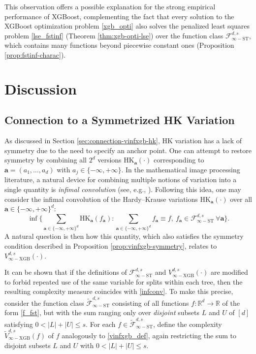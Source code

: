\documentclass[10pt]{article}
\newcommand{\R}{{\mathbb R}}
\newcommand{\fstinf}{{\mathcal{F}^{d, s}_{\infty-\text{ST}}}}
\newcommand{\oldfstinf}{{\widetilde{\mathcal{F}}^{d, s}_{\infty-\text{ST}}}}
\newcommand{\vinfxgb}{{V^{d, s}_{\infty-\text{XGB}}}}
\newcommand{\oldvinfxgb}{{\widetilde{V}^{d, s}_{\infty-\text{XGB}}}}
\newcommand{\hk}{{\text{HK}}}
\newcommand{\abf}{{\mathbf{a}}}
\begin{document}
This observation offers a possible explanation for the strong 
empirical performance of XGBoost, complementing the fact 
that every solution to the XGBoost optimization problem 
\eqref{xgb_opti} also solves the penalized least squares problem 
\eqref{lse_fstinf} (Theorem \ref{thm:xgb-opti-lse}) over the 
function class $\fstinf$, which contains many functions beyond 
piecewise constant ones (Proposition \ref{prop:fstinf-charac}).



\section{Discussion}\label{sec:discussion}
\subsection{Connection to a Symmetrized HK Variation}
\label{inf_conv}

As discussed in Section \ref{sec:connection-vinfxgb-hk}, HK variation
has a lack of symmetry due to the need to specify an anchor point. 
One can attempt to restore symmetry by combining all $2^d$ versions 
$\hk_{\abf}(\cdot)$ corresponding to $\abf = (a_1, \dots, a_d)$ with 
$a_j \in \{-\infty, +\infty\}$. In the mathematical image processing 
literature, a natural device for combining multiple notions of 
variation into a single quantity is \textit{infimal convolution} 
(see, e.g., \citet{chambolle1997image, bergounioux2016mathematical,
setzer2008variational, setzer2011infimal, bredies2020higher}). 
Following this idea, one may consider the infimal convolution of 
the Hardy–Krause variations $\hk_{\abf}(\cdot)$ over all 
$\abf \in \{-\infty, +\infty\}^d$: 
\begin{equation}\label{infconv}
    \inf \Big\{\sum_{\abf \in \{-\infty, +\infty\}^d} 
    \hk_{\abf}(f_{\abf}): 
    \sum_{\abf \in \{-\infty, +\infty\}^d} f_{\abf} \equiv f,
    \ f_{\abf} \in \fstinf \ \forall \abf\Big\}.
\end{equation}
A natural question is then how this quantity, which also satisfies 
the symmetry condition described in 
Proposition \ref{prop:vinfxgb-symmetry}, relates to $\vinfxgb(\cdot)$.

It can be shown that if the definitions of $\fstinf$ and 
$\vinfxgb(\cdot)$ are modified to forbid repeated use of the 
same variable for splits within each tree, then the resulting 
complexity measure coincides with \eqref{infconv}. To make this 
precise, consider the function class $\oldfstinf$ consisting of all 
functions $f: \R^d \to \R$ of the form \eqref{f_fst}, but with the 
sum ranging only over \textit{disjoint} subsets $L$ and $U$ of $[d]$ 
satisfying $0 < |L| + |U| \le s$. For each $f \in \oldfstinf$, 
define the complexity $\oldvinfxgb(f)$ of $f$ analogously to 
\eqref{vinfxgb_def}, again restricting the sum to disjoint subsets 
$L$ and $U$ with $0 < |L| + |U| \le s$. 
\end{document}
